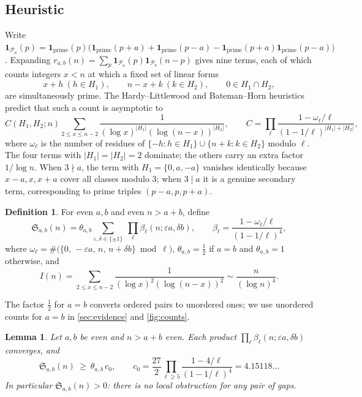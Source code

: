 \documentclass[11pt]{amsart}
\newtheorem{lemma}[theorem]{Lemma}
\theoremstyle{definition}
\newtheorem{definition}[theorem]{Definition}
\theoremstyle{remark}
\newcommand{\PP}{\mathcal{P}}
\newcommand{\Sg}{\mathfrak{S}}
\begin{document}
\subsection{Heuristic}
Write $\mathbf 1_{\PP_a}(p)=\mathbf 1_{\mathrm{prime}}(p)\bigl(\mathbf 1_{\mathrm{prime}}(p+a)+\mathbf 1_{\mathrm{prime}}(p-a)-\mathbf 1_{\mathrm{prime}}(p+a)\mathbf 1_{\mathrm{prime}}(p-a)\bigr)$. Expanding $r_{a,b}(n)=\sum_{p}\mathbf 1_{\PP_a}(p)\mathbf 1_{\PP_b}(n-p)$ gives nine terms, each of which counts integers $x<n$ at which a fixed set of linear forms
\[
x+h\ (h\in H_1),\qquad n-x+k\ (k\in H_2),\qquad 0\in H_1\cap H_2,
\]
are simultaneously prime. The Hardy--Littlewood and Bateman--Horn heuristics \cite{HardyLittlewood1923,BatemanHorn1962} predict that such a count is asymptotic to
\begin{equation}\label{eq:BH}
C(H_1,H_2;n)\sum_{2\le x\le n-2}\frac{1}{(\log x)^{|H_1|}(\log(n-x))^{|H_2|}},\qquad
C=\prod_{\ell}\frac{1-\omega_\ell/\ell}{(1-1/\ell)^{|H_1|+|H_2|}},
\end{equation}
where $\omega_\ell$ is the number of residues of $\{-h:h\in H_1\}\cup\{n+k:k\in H_2\}$ modulo $\ell$. The four terms with $|H_1|=|H_2|=2$ dominate; the others carry an extra factor $1/\log n$. When $3\nmid a$, the term with $H_1=\{0,a,-a\}$ vanishes identically because $x-a,x,x+a$ cover all classes modulo $3$; when $3\mid a$ it is a genuine secondary term, corresponding to prime triples $(p-a,p,p+a)$.

\begin{definition}
For even $a,b$ and even $n>a+b$, define
\[
\Sg_{a,b}(n)=\theta_{a,b}\sum_{\varepsilon,\delta\in\{\pm1\}}\ \prod_{\ell}\beta_\ell(n;\varepsilon a,\delta b),\qquad
\beta_\ell=\frac{1-\omega_\ell/\ell}{(1-1/\ell)^4},
\]
where $\omega_\ell=\#\bigl(\{0,\,-\varepsilon a,\,n,\,n+\delta b\}\bmod\ell\bigr)$, $\theta_{a,b}=\tfrac12$ if $a=b$ and $\theta_{a,b}=1$ otherwise, and
\[
I(n)=\sum_{2\le x\le n-2}\frac{1}{(\log x)^2(\log(n-x))^2}\sim\frac{n}{(\log n)^4}.
\]
\end{definition}

The factor $\tfrac12$ for $a=b$ converts ordered pairs to unordered ones; we use unordered counts for $a=b$ in \cref{sec:evidence} and \cref{fig:counts}.

\begin{lemma}\label{lem:positivity}
Let $a,b$ be even and $n>a+b$ even. Each product $\prod_\ell\beta_\ell(n;\varepsilon a,\delta b)$ converges, and
\[
\Sg_{a,b}(n)\ \ge\ \theta_{a,b}\,c_0,\qquad
c_0=\frac{27}{2}\prod_{\ell\ge 5}\frac{1-4/\ell}{(1-1/\ell)^4}=4.15118\ldots
\]
In particular $\Sg_{a,b}(n)>0$: there is no local obstruction for any pair of gaps.
\end{lemma}
\end{document}
